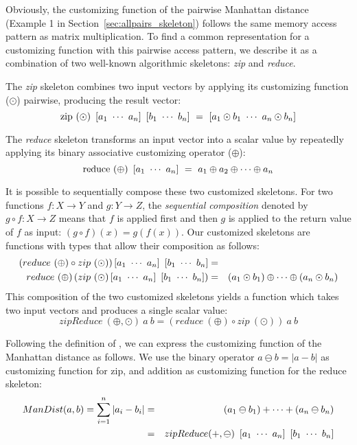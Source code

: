 Obviously, the customizing function of the pairwise Manhattan distance (Example 1 in Section~\ref{sec:allpairs_skeleton}) follows the same memory access pattern as matrix multiplication.
To find a common representation for a customizing function with this pairwise access pattern, we describe it as a combination of two well-known algorithmic skeletons: \emph{zip} and \emph{reduce}.

The \emph{zip} skeleton combines two input vectors by applying its customizing function ($\odot$) pairwise, producing the result vector:
\[ \zip\ (\odot)\ \DottedVector{a_1}{a_n}\ \DottedVector{b_1}{b_n}\ =\ \DottedVector{a_1 \odot b_1}{a_n \odot b_n} \]

The \emph{reduce} skeleton transforms an input vector into a scalar value by repeatedly applying its binary associative customizing operator ($\oplus$):
\[ \reduce\ (\oplus)\ \DottedVector{a_1}{a_n}\ =\ a_1 \oplus a_2 \oplus \cdots \oplus a_n \]

It is possible to sequentially compose these two customized skeletons.
For two functions $f: X \to Y$ and $g: Y\to Z$, the \emph{sequential composition} denoted by $g \circ f: X \to Z$ means that $f$ is applied first and then $g$ is applied to the return value of $f$ as input: $(g\circ f)(x) = g(f(x))$.
Our customized skeletons are functions with types that allow their composition as follows:
\begin{eqnarray*}
  (reduce\ (\oplus) \circ zip\ (\odot) ) \DottedVector{a_1}{a_n}\ \DottedVector{b_1}{b_n} &=& \\
  reduce\ (\oplus) \left( zip\ (\odot) \DottedVector{a_1}{a_n}\ \DottedVector{b_1}{b_n} \right) &=& (a_1 \odot b_1) \oplus \cdots \oplus (a_n \odot b_n)
\end{eqnarray*}
This composition of the two customized skeletons yields a function which takes two input vectors and produces a single scalar value:
\begin{equation}
  zipReduce\ (\oplus, \odot)\ a\ b = 
  \left( reduce\ (\oplus) \circ zip\ (\odot) \right)\ a\ b
\end{equation}

Following the definition of {\zipReduce}, we can express the customizing function of the Manhattan distance as follows.
We use the binary operator $a \ominus b = |a - b|$ as customizing function for zip, and addition as customizing function for the reduce skeleton:
\begin{eqnarray*}
    ManDist(a, b) = \sum_{i=1}^{n} | a_i - b_i | &=&
    (a_1 \ominus b_1) + \cdots + (a_n \ominus b_n) \\
    &=& zipReduce(+, \ominus)\ \DottedVector{a_1}{a_n}\ \DottedVector{b_1}{b_n}
\end{eqnarray*}

